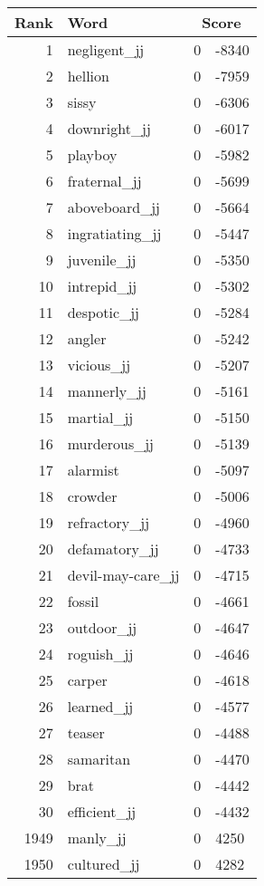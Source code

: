 \begin{longtable}[!htbp]{| rlr@{.}l |}
    \hline
    \textbf{Rank} & \textbf{Word} & \multicolumn{2}{c|}{\textbf{Score}} \\
    \hline
    \endhead
    1 & negligent\_jj & 0 & -8340 \\
    2 & hellion & 0 & -7959 \\
    3 & sissy & 0 & -6306 \\
    4 & downright\_jj & 0 & -6017 \\
    5 & playboy & 0 & -5982 \\
    6 & fraternal\_jj & 0 & -5699 \\
    7 & aboveboard\_jj & 0 & -5664 \\
    8 & ingratiating\_jj & 0 & -5447 \\
    9 & juvenile\_jj & 0 & -5350 \\
    10 & intrepid\_jj & 0 & -5302 \\
    11 & despotic\_jj & 0 & -5284 \\
    12 & angler & 0 & -5242 \\
    13 & vicious\_jj & 0 & -5207 \\
    14 & mannerly\_jj & 0 & -5161 \\
    15 & martial\_jj & 0 & -5150 \\
    16 & murderous\_jj & 0 & -5139 \\
    17 & alarmist & 0 & -5097 \\
    18 & crowder & 0 & -5006 \\
    19 & refractory\_jj & 0 & -4960 \\
    20 & defamatory\_jj & 0 & -4733 \\
    21 & devil-may-care\_jj & 0 & -4715 \\
    22 & fossil & 0 & -4661 \\
    23 & outdoor\_jj & 0 & -4647 \\
    24 & roguish\_jj & 0 & -4646 \\
    25 & carper & 0 & -4618 \\
    26 & learned\_jj & 0 & -4577 \\
    27 & teaser & 0 & -4488 \\
    28 & samaritan & 0 & -4470 \\
    29 & brat & 0 & -4442 \\
    30 & efficient\_jj & 0 & -4432 \\
    1949 & manly\_jj & 0 & 4250 \\
    1950 & cultured\_jj & 0 & 4282 \\

\end{longtable}
